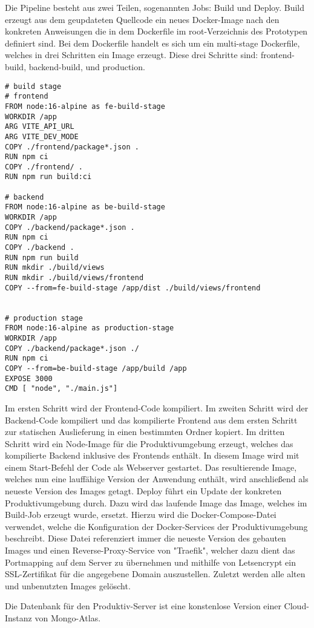 Die Pipeline besteht aus zwei Teilen, sogenannten Jobs: Build und Deploy.
Build erzeugt aus dem geupdateten Quellcode ein neues Docker-Image nach den konkreten Anweisungen die in dem Dockerfile im root-Verzeichnis des Prototypen definiert sind. Bei dem Dockerfile handelt es sich um ein multi-stage Dockerfile, welches in drei Schritten ein Image erzeugt. Diese drei Schritte sind:
frontend-build, backend-build, und production.

\begin{lstlisting}[caption=Dockerfile zum Bauen des Images]
# build stage
# frontend
FROM node:16-alpine as fe-build-stage
WORKDIR /app
ARG VITE_API_URL
ARG VITE_DEV_MODE
COPY ./frontend/package*.json .
RUN npm ci
COPY ./frontend/ .
RUN npm run build:ci

# backend
FROM node:16-alpine as be-build-stage
WORKDIR /app
COPY ./backend/package*.json .
RUN npm ci
COPY ./backend .
RUN npm run build
RUN mkdir ./build/views
RUN mkdir ./build/views/frontend
COPY --from=fe-build-stage /app/dist ./build/views/frontend


# production stage
FROM node:16-alpine as production-stage
WORKDIR /app
COPY ./backend/package*.json ./
RUN npm ci
COPY --from=be-build-stage /app/build /app
EXPOSE 3000
CMD [ "node", "./main.js"]
\end{lstlisting}

Im ersten Schritt wird der Frontend-Code kompiliert. Im zweiten Schritt wird der Backend-Code kompiliert und das kompilierte Frontend aus dem ersten Schritt zur statischen Auslieferung in einen bestimmten Ordner kopiert. Im dritten Schritt wird ein Node-Image für die Produktivumgebung erzeugt, welches das kompilierte Backend inklusive des Frontends enthält. In diesem Image wird mit einem Start-Befehl der Code als Webserver gestartet.
Das resultierende Image, welches nun eine lauffähige Version der Anwendung enthält, wird anschließend als neueste Version des Images getagt.
Deploy führt ein Update der konkreten Produktivumgebung durch. Dazu wird das laufende Image das Image, welches im Build-Job erzeugt wurde, ersetzt. Hierzu wird die Docker-Compose-Datei verwendet, welche die Konfiguration der Docker-Services der Produktivumgebung beschreibt. Diese Datei referenziert immer die neueste Version des gebauten Images und einen Reverse-Proxy-Service von "Traefik", welcher dazu dient das Portmapping auf dem Server zu übernehmen und mithilfe von Letsencrypt ein SSL-Zertifikat für die angegebene Domain auszustellen.
Zuletzt werden alle alten und unbenutzten Images gelöscht.

Die Datenbank für den Produktiv-Server ist eine konstenlose Version einer Cloud-Instanz von Mongo-Atlas.